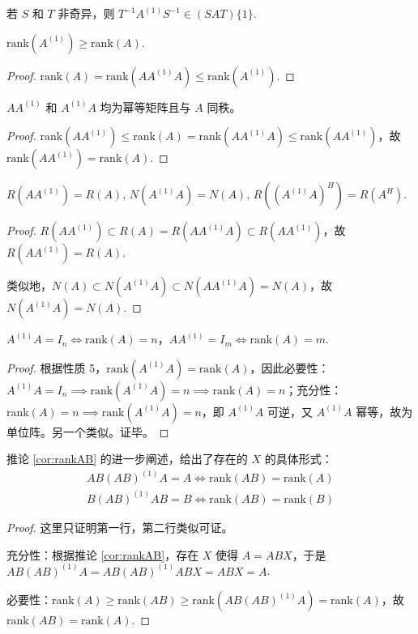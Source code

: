 \begin{property}[3]
若 $S$ 和 $T$ 非奇异，则 $T^{-1}A^{(1)}S^{-1}\in(SAT)\{1\}$.
\end{property}

\begin{property}[4]
$\text{rank}(A^{(1)})\geq \text{rank}(A)$.
\end{property}
\begin{proof}
$\text{rank}(A)=\text{rank}(AA^{(1)}A)\leq\text{rank}(A^{(1)})$.
\end{proof}

\begin{property}[5]
$AA^{(1)}$ 和 $A^{(1)}A$ 均为幂等矩阵且与 $A$ 同秩。
\end{property}
\begin{proof}
$\text{rank}(AA^{(1)})\leq\text{rank}(A)=\text{rank}(AA^{(1)}A)\leq\text{rank}(AA^{(1)})$，故 $\text{rank}(AA^{(1)})=\text{rank}(A)$.
\end{proof}

\begin{property}[6]
$R(AA^{(1)})=R(A),\,N(A^{(1)}A)=N(A),\,R((A^{(1)}A)^H)=R(A^H)$.
\end{property}
\begin{proof}
$R(AA^{(1)})\subset R(A)=R(AA^{(1)}A)\subset R(AA^{(1)})$，故 $R(AA^{(1)})=R(A)$.

类似地，$N(A)\subset N(A^{(1)}A)\subset N(AA^{(1)}A)=N(A)$，故 $N(A^{(1)}A)=N(A)$.
\end{proof}

\begin{property}[7]
$A^{(1)}A=I_n\iff \text{rank}(A)=n$，$AA^{(1)}=I_m\iff \text{rank}(A)=m$.
\end{property}
\begin{proof}
根据性质 5，$\text{rank}(A^{(1)}A)=\text{rank}(A)$，因此必要性：$A^{(1)}A=I_n\implies\text{rank}(A^{(1)}A)=n\implies\text{rank}(A)=n$；充分性：$\text{rank}(A)=n\implies \text{rank}(A^{(1)}A)=n$，即 $A^{(1)}A$ 可逆，又 $A^{(1)}A$ 幂等，故为单位阵。另一个类似。证毕。
\end{proof}

\begin{property}[8]
推论 \ref{cor:rankAB} 的进一步阐述，给出了存在的 $X$ 的具体形式：
\begin{gather*}
    AB(AB)^{(1)}A=A\iff\text{rank}(AB)=\text{rank}(A)\\
    B(AB)^{(1)}AB=B\iff\text{rank}(AB)=\text{rank}(B)
\end{gather*}
\end{property}
\begin{proof}
这里只证明第一行，第二行类似可证。

充分性：根据推论 \ref{cor:rankAB}，存在 $X$ 使得 $A=ABX$，于是 $AB(AB)^{(1)}A=AB(AB)^{(1)}ABX=ABX=A$.

必要性：$\text{rank}(A)\geq\text{rank}(AB)\geq\text{rank}(AB(AB)^{(1)}A)=\text{rank}(A)$，故 $\text{rank}(AB)=\text{rank}(A)$.
\end{proof}

